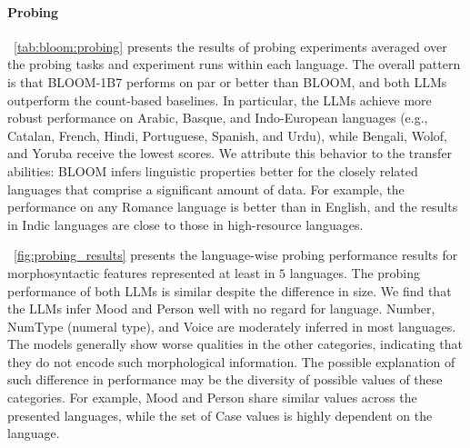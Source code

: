 \documentclass[twoside,11pt]{article}
\begin{document}
\paragraph{Probing} ~\autoref{tab:bloom:probing} presents the results of probing experiments averaged over the probing tasks and experiment runs within each language. The overall pattern is that BLOOM-1B7 performs on par or better than BLOOM, and both LLMs outperform the count-based baselines. In particular, the LLMs achieve more robust performance on Arabic, Basque, and Indo-European languages (e.g., Catalan, French, Hindi, Portuguese, Spanish, and Urdu), while Bengali, Wolof, and Yoruba receive the lowest scores. We attribute this behavior to the transfer abilities: BLOOM infers linguistic properties better for the closely related languages that comprise a significant amount of data. For example, the performance on any Romance language is better than in English, and the results in Indic languages are close to those in high-resource languages.  

~\autoref{fig:probing_results} presents the language-wise probing performance results for morphosyntactic features represented at least in $5$ languages. The probing performance of both LLMs is similar despite the difference in size. We find that the LLMs infer Mood and Person well with no regard for language. Number, NumType (numeral type), and Voice are moderately inferred in most languages. The models generally show worse qualities in the other categories, indicating that they do not encode such morphological information. The possible explanation of such difference in performance may be the diversity of possible values of these categories. For example, Mood and Person share similar values across the presented languages, while the set of Case values is highly dependent on the language.
\end{document}
